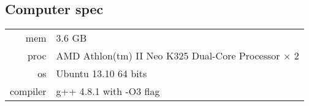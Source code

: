 \subsection{Computer spec}

\begin{tabular}{rl}
mem & 3.6 GB\\
proc & AMD Athlon(tm) II Neo K325 Dual-Core Processor × 2\\
os & Ubuntu 13.10 64 bits\\
compiler & g++ 4.8.1 with -O3 flag\\
\end{tabular}
